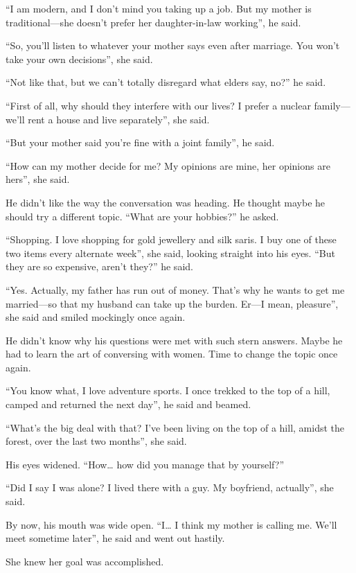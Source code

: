 “I am modern, and I don't mind you taking up a job. But my mother is
traditional—she doesn't prefer her daughter-in-law working”, he said.

“So, you'll listen to whatever your mother says even after marriage. You won't
take your own decisions”, she said.

“Not like that, but we can't totally disregard what elders say, no?” he said.

“First of all, why should they interfere with our lives? I prefer a nuclear
family—we'll rent a house and live separately”, she said.

“But your mother said you're fine with a joint family”, he said.

“How can my mother decide for me? My opinions are mine, her opinions are hers”,
she said.

He didn't like the way the conversation was heading. He thought maybe he should
try a different topic. “What are your hobbies?” he asked.

“Shopping. I love shopping for gold jewellery and silk saris. I buy one of these
two items every alternate week”, she said, looking straight into his eyes.
“But they are so expensive, aren't they?” he said.

“Yes. Actually, my father has run out of money. That's why he wants to get me
married—so that my husband can take up the burden. Er—I mean, pleasure”, she
said and smiled mockingly once again.

He didn't know why his questions were met with such stern answers. Maybe he had
to learn the art of conversing with women. Time to change the topic once
again.

“You know what, I love adventure sports. I once trekked to the top of a hill,
camped and returned the next day”, he said and beamed.

“What's the big deal with that? I've been living on the top of a hill, amidst
the forest, over the last two months”, she said.

His eyes widened. “How… how did you manage that by yourself?”

“Did I say I was alone? I lived there with a guy. My boyfriend, actually”, she
said.

By now, his mouth was wide open. “I… I think my mother is calling me. We'll
meet sometime later”, he said and went out hastily.

She knew her goal was accomplished.

